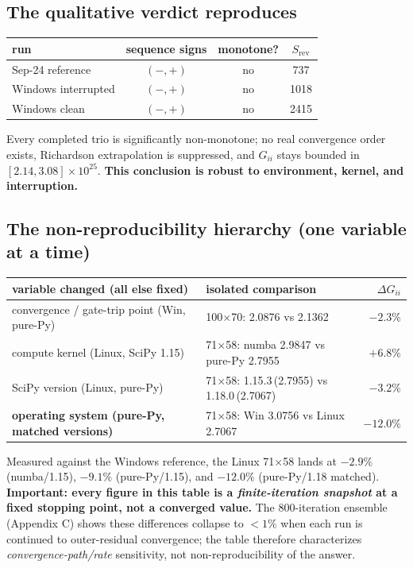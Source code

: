 \documentclass[11pt]{article}
\newcommand{\ten}[1]{\times 10^{#1}}
\begin{document}
\subsection{The qualitative verdict reproduces}
\begin{center}\small
\begin{tabular}{l c c c}
\toprule
run & sequence signs & monotone? & $S_{\mathrm{rev}}$ \\
\midrule
Sep-24 reference    & $(-,+)$ & no & 737 \\
Windows interrupted & $(-,+)$ & no & 1018 \\
Windows clean       & $(-,+)$ & no & 2415 \\
\bottomrule
\end{tabular}
\end{center}
Every completed trio is significantly non-monotone; no real convergence order exists, Richardson extrapolation is suppressed, and $G_{ii}$ stays bounded in $[2.14,3.08]\ten{25}$. \textbf{This conclusion is robust to environment, kernel, and interruption.}

\subsection{The non-reproducibility hierarchy (one variable at a time)}
\begin{center}\small
\begin{tabular}{l l r}
\toprule
variable changed (all else fixed) & isolated comparison & $\Delta G_{ii}$ \\
\midrule
convergence / gate-trip point (Win, pure-Py) & 100$\times$70: 2.0876 vs 2.1362 & $-2.3\%$ \\
compute kernel (Linux, SciPy 1.15) & 71$\times$58: numba 2.9847 vs pure-Py 2.7955 & $+6.8\%$ \\
SciPy version (Linux, pure-Py) & 71$\times$58: 1.15.3\,(2.7955) vs 1.18.0\,(2.7067) & $-3.2\%$ \\
\textbf{operating system (pure-Py, matched versions)} & 71$\times$58: Win 3.0756 vs Linux 2.7067 & $\mathbf{-12.0\%}$ \\
\bottomrule
\end{tabular}
\end{center}
Measured against the Windows reference, the Linux 71$\times$58 lands at $-2.9\%$ (numba/1.15), $-9.1\%$ (pure-Py/1.15), and $-12.0\%$ (pure-Py/1.18 matched). \textbf{Important: every figure in this table is a \emph{finite-iteration snapshot} at a fixed stopping point, not a converged value.} The 800-iteration ensemble (Appendix C) shows these differences collapse to $<1\%$ when each run is continued to outer-residual convergence; the table therefore characterizes \emph{convergence-path/rate} sensitivity, not non-reproducibility of the answer.
\end{document}
